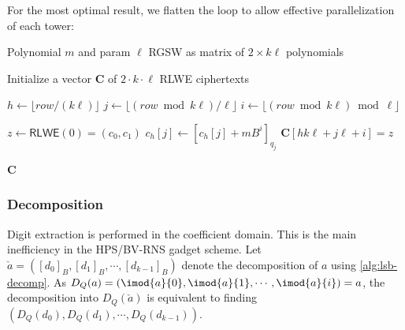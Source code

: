 For the most optimal result, we flatten the loop to allow effective parallelization of each tower: 
\begin{algorithm}
\caption{Encrypt RGSW (optimized)}
\label{alg:rgsw:encrypt}
\begin{algorithmic}[1]
\Require Polynomial $m$ and param $\ell$
\Ensure RGSW as matrix of $2\times k \ell$ polynomials

\State Initialize a vector $\mathbf{C}$ of $2 \cdot k \cdot \ell$ RLWE ciphertexts

\For{$row \in [0, 2\cdot k \cdot \ell)$ \textbf{in parallel}}
    \State $h \leftarrow \lfloor row / (k\ell) \rfloor $
    \State $j \leftarrow \lfloor (row \bmod{k\ell}) / \ell \rfloor$
    \State $i \leftarrow \lfloor (row \bmod{k\ell}) \bmod{\ell} \rfloor$

    \State $z \leftarrow \mathsf{RLWE}(0) = (c_0, c_1)$
    \State $c_h[j] \leftarrow [c_h[j] + mB^i]_{q_j}$
    \State $\mathbf{C}[h k \ell + j \ell + i] = z$
\EndFor

\State \Return $\mathbf{C}$
\end{algorithmic}
\end{algorithm}



\subsubsection{Decomposition}
Digit extraction is performed in the coefficient domain. This is the main inefficiency in the HPS/BV-RNS gadget scheme. Let $\check{a} = ([d_0]_B, [d_1]_B, \cdots, [d_{k-1}]_B)$ denote the decomposition of $a$ using \autoref{alg:lsb-decomp}. As $D_Q(a) = \left( \imod{a}{0}, \imod{a}{1}, \cdots, \imod{a}{i}\right) = a$, the decomposition into $D_Q(\check{a})$ is equivalent to finding $\left( D_Q(d_0), D_Q(d_1), \cdots, D_Q(d_{k-1})\right)$.

